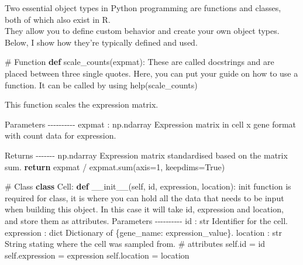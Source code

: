 \documentclass[
  letterpaper,
  DIV=11,
  numbers=noendperiod]{scrartcl}
\newenvironment{Shaded}{\begin{snugshade}}{\end{snugshade}}
\newcommand{\BuiltInTok}[1]{\textcolor[rgb]{0.00,0.23,0.31}{#1}}
\newcommand{\CommentTok}[1]{\textcolor[rgb]{0.37,0.37,0.37}{#1}}
\newcommand{\ControlFlowTok}[1]{\textcolor[rgb]{0.00,0.23,0.31}{\textbf{#1}}}
\newcommand{\DecValTok}[1]{\textcolor[rgb]{0.68,0.00,0.00}{#1}}
\newcommand{\FunctionTok}[1]{\textcolor[rgb]{0.28,0.35,0.67}{#1}}
\newcommand{\KeywordTok}[1]{\textcolor[rgb]{0.00,0.23,0.31}{\textbf{#1}}}
\newcommand{\NormalTok}[1]{\textcolor[rgb]{0.00,0.23,0.31}{#1}}
\newcommand{\OperatorTok}[1]{\textcolor[rgb]{0.37,0.37,0.37}{#1}}
\newcommand{\VariableTok}[1]{\textcolor[rgb]{0.07,0.07,0.07}{#1}}
\begin{document}
Two essential object types in Python programming are functions and
classes, both of which also exist in R.\\
They allow you to define custom behavior and create your own object
types. Below, I show how they're typically defined and used.

\begin{Shaded}
\begin{Highlighting}[]
\CommentTok{\# Function}
\KeywordTok{def}\NormalTok{ scale\_counts(expmat):}
    \CommentTok{\textquotesingle{}\textquotesingle{}\textquotesingle{}}
\CommentTok{    These are called docstrings and are placed between three single quotes.}
\CommentTok{    Here, you can put your guide on how to use a function.}
\CommentTok{    It can be called by using help(scale\_counts)}

\CommentTok{    This function scales the expression matrix.}

\CommentTok{    Parameters}
\CommentTok{    {-}{-}{-}{-}{-}{-}{-}{-}{-}{-}}
\CommentTok{    expmat : np.ndarray}
\CommentTok{        Expression matrix in cell x gene format with count data for expression.}

\CommentTok{    Returns}
\CommentTok{    {-}{-}{-}{-}{-}{-}{-}}
\CommentTok{    np.ndarray}
\CommentTok{        Expression matrix standardised based on the matrix sum.}
\CommentTok{    \textquotesingle{}\textquotesingle{}\textquotesingle{}}
    \ControlFlowTok{return}\NormalTok{ expmat }\OperatorTok{/}\NormalTok{ expmat.}\BuiltInTok{sum}\NormalTok{(axis}\OperatorTok{=}\DecValTok{1}\NormalTok{, keepdims}\OperatorTok{=}\VariableTok{True}\NormalTok{)}

\CommentTok{\# Class}
\KeywordTok{class}\NormalTok{ Cell:}
    \KeywordTok{def} \FunctionTok{\_\_init\_\_}\NormalTok{(}\VariableTok{self}\NormalTok{, }\BuiltInTok{id}\NormalTok{, expression, location):}
        \CommentTok{\textquotesingle{}\textquotesingle{}\textquotesingle{}}
\CommentTok{        init function is required for class, it is where you can hold all the data that needs to be input when building this object.}
\CommentTok{        In this case it will take id, expression and location, and store them as attributes.}
\CommentTok{        Parameters}
\CommentTok{        {-}{-}{-}{-}{-}{-}{-}{-}{-}{-}}
\CommentTok{        id : str}
\CommentTok{            Identifier for the cell.}
\CommentTok{        expression : dict}
\CommentTok{            Dictionary of \{gene\_name: expression\_value\}.}
\CommentTok{        location : str}
\CommentTok{            String stating where the cell was sampled from.}
\CommentTok{        \textquotesingle{}\textquotesingle{}\textquotesingle{}}
        \CommentTok{\# attributes}
        \VariableTok{self}\NormalTok{.}\BuiltInTok{id} \OperatorTok{=} \BuiltInTok{id}
        \VariableTok{self}\NormalTok{.expression }\OperatorTok{=}\NormalTok{ expression}
        \VariableTok{self}\NormalTok{.location }\OperatorTok{=}\NormalTok{ location}
        

\end{Highlighting}
\end{Shaded}
\end{document}
